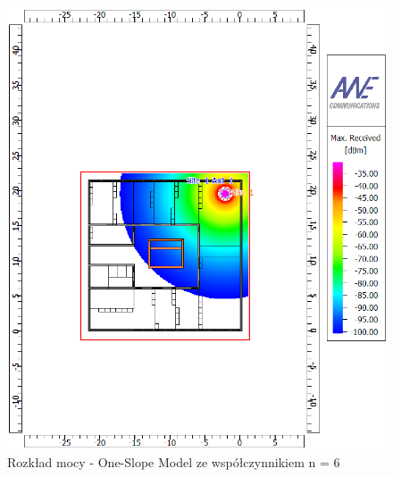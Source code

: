 \documentclass[12pt, a4paper, oneside]{article}
\begin{document}
\begin{figure}[h]
\centering
\caption{Rozkład mocy - One-Slope Model ze współczynnikiem n = 6}
\includegraphics[scale=0.65]{ONE_SLOPE_RECEIVED_EXP_6.png}
\end{figure}
\clearpage
\end{document}
